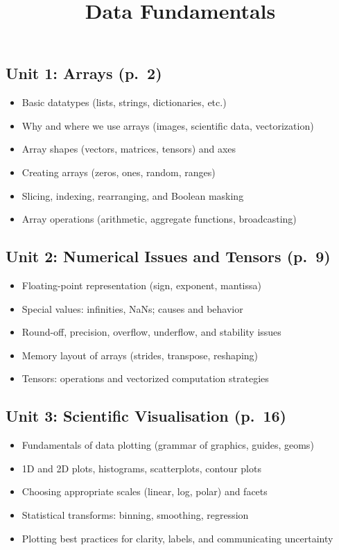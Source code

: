 \documentclass{article}
\title{Data Fundamentals}
\author{}
\date{}
\begin{document}
\small

\subsection*{Unit 1: Arrays (p.~2)}
\begin{itemize}
    \item Basic datatypes (lists, strings, dictionaries, etc.)
    \item Why and where we use arrays (images, scientific data, vectorization)
    \item Array shapes (vectors, matrices, tensors) and axes
    \item Creating arrays (zeros, ones, random, ranges)
    \item Slicing, indexing, rearranging, and Boolean masking
    \item Array operations (arithmetic, aggregate functions, broadcasting)
\end{itemize}

\subsection*{Unit 2: Numerical Issues and Tensors (p.~9)}
\begin{itemize}
    \item Floating-point representation (sign, exponent, mantissa)
    \item Special values: infinities, NaNs; causes and behavior
    \item Round-off, precision, overflow, underflow, and stability issues
    \item Memory layout of arrays (strides, transpose, reshaping)
    \item Tensors: operations and vectorized computation strategies
\end{itemize}

\subsection*{Unit 3: Scientific Visualisation (p.~16)}
\begin{itemize}
    \item Fundamentals of data plotting (grammar of graphics, guides, geoms)
    \item 1D and 2D plots, histograms, scatterplots, contour plots
    \item Choosing appropriate scales (linear, log, polar) and facets
    \item Statistical transforms: binning, smoothing, regression
    \item Plotting best practices for clarity, labels, and communicating uncertainty
\end{itemize}
\end{document}
